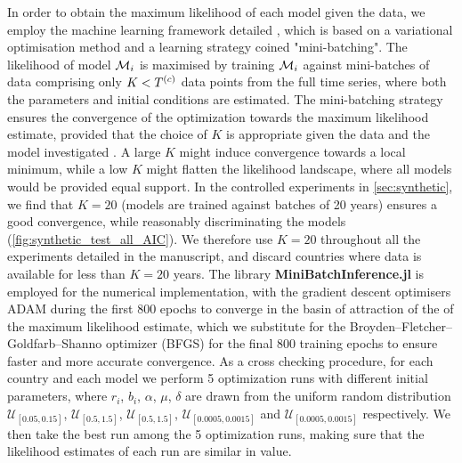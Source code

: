 In order to obtain the maximum likelihood of each model given the data, we employ the machine learning framework detailed \cite{Boussange2022a}, which is based on a variational optimisation method and a learning strategy coined "mini-batching". The likelihood of model $\mathcal{M}_i$ is maximised by training $\mathcal{M}_i$ against mini-batches of data comprising only $K < T^{(c)}$ data points from the full time series, where both the parameters and initial conditions are estimated.
% 
The mini-batching strategy ensures the convergence of the optimization towards the maximum likelihood estimate, provided that the choice of $K$ is appropriate given the data and the model investigated \cite{Boussange2022a}. 
% 
A large $K$ might induce convergence towards a local minimum, while a low $K$ might flatten the likelihood landscape, where all models would be provided equal support. 
% 
In the controlled experiments in \cref{sec:synthetic}, we find that $K=20$ (models are trained against batches of 20 years) ensures a good convergence, while reasonably discriminating the models (\cref{fig:synthetic_test_all_AIC}). We therefore use $K=20$ throughout all the experiments detailed in the manuscript, and discard countries where data is available for less than $K = 20$ years.
% 
The library \textbf{MiniBatchInference.jl} \cite{Boussange2022a} is employed for the numerical implementation, with the gradient descent optimisers ADAM \cite{Kingma2014} during the first 800 epochs to converge in the basin of attraction of the of the maximum likelihood estimate, which we substitute for the Broyden–Fletcher–Goldfarb–Shanno optimizer (BFGS) \cite{fletcher2013practical} for the final 800 training epochs to ensure faster and more accurate convergence.
% 
As a cross checking procedure, for each country and each model we perform 5 optimization runs with different initial parameters, where $r_i$, $b_i$, $\alpha$, $\mu$, $\delta$ are drawn from the uniform random distribution $\mathcal{U}_{[0.05, 0.15]}$, $\mathcal{U}_{[0.5,1.5]}$, $\mathcal{U}_{[0.5,1.5]}$, $\mathcal{U}_{[0.0005, 0.0015]}$ and $\mathcal{U}_{[0.0005, 0.0015]}$ respectively.
% 
We then take the best run among the 5 optimization runs, making sure that the likelihood estimates of each run are similar in value.
% 

